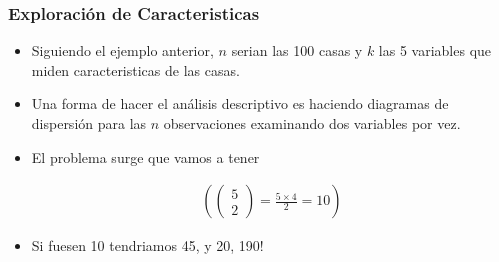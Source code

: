 \documentclass[
  shownotes,
  xcolor={svgnames},
  hyperref={colorlinks,citecolor=DarkBlue,linkcolor=DarkRed,urlcolor=DarkBlue}
  , aspectratio=169]{beamer}
\begin{document}
\begin{frame}
\frametitle{Exploración de Caracteristicas}







\begin{itemize}

\item Siguiendo el ejemplo anterior, \(n\) serian las 100 casas  y \(k\) las 5 variables que miden caracteristicas de las casas. 
\medskip
\item Una forma de hacer el análisis descriptivo es haciendo diagramas de dispersión para las \(n\) observaciones examinando dos variables por vez.
\medskip
\item  El problema surge que vamos a tener

\begin{align}
\left(\left(\begin{array}{c} 5\\ 2 \end{array}\right)=\frac{5\times4}{2}=10\right)
\end{align}

\item Si fuesen 10 tendriamos 45, y 20, 190!

\end{itemize}

\end{frame}
\end{document}
